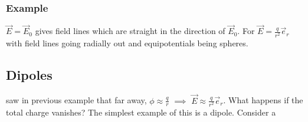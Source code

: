 \subsubsection*{Example}

$\vec{E} = \vec{E}_0$ gives field lines which are straight in the direction of $\vec{E}_0$. For $\vec{E} = \frac{q}{r^2} \vec{e}_r$ with field lines going radially out and equipotentials being spheres.

\subsection{Dipoles}

saw in previous example that far away, $\phi \approx \frac{q}{r}$ $\implies$ $\vec{E} \approx \frac{q}{r^2}\vec{e}_r$. What happens if the total charge vanishes? The simplest example of this is a dipole. Consider a 